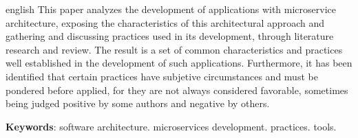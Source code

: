 \setlength{\absparsep}{18pt} %
\begin{resumo}[Abstract]
 \begin{otherlanguage*}{english}
   This paper analyzes the development of applications with microservice architecture, exposing the characteristics of this architectural approach and gathering and discussing practices used in its development, through literature research and review. The result is a set of common characteristics and practices well established in the development of such applications. Furthermore, it has been identified that certain practices have subjetive circumstances and must be pondered before applied, for they are not always considered favorable, sometimes being judged positive by some authors and negative by others.
   

   \vspace{\onelineskip}
 
   \noindent 
   \textbf{Keywords}: software architecture. microservices development. practices. tools.
 \end{otherlanguage*}
\end{resumo}